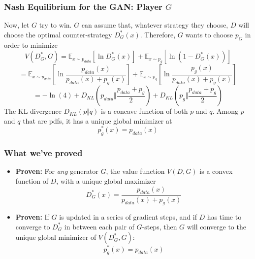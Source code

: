 \documentclass{beamer}
\begin{document}
\begin{frame}
  \frametitle{Nash Equilibrium for the GAN: Player $G$}

  Now, let $G$ try to win. $G$ can assume that, whatever strategy they
  choose, $D$ will choose the optimal counter-strategy $D_G^*(x)$.  Therefore,
  $G$ wants to choose $p_G$ in order to minimize
  \begin{displaymath}
    V(D^*_G,G) = \mathbb{E}_{x\sim p_{data}}\left[\ln D_G^*(x)\right]
    +\mathbb{E}_{x\sim p_g}\left[\ln\left(1-D_G^*(x)\right)\right]
  \end{displaymath}
  \begin{displaymath}
    = \mathbb{E}_{x\sim p_{data}}\left[\ln\frac{p_{data}(x)}{p_{data}(x)+p_g(x)}\right]
    +\mathbb{E}_{x\sim p_g}\left[\ln\frac{p_g(x)}{p_{data}(x)+p_g(x)}\right]
  \end{displaymath}
  \begin{displaymath}
    = -\ln(4)+D_{KL}\left(p_{data}\Vert\frac{p_{data}+p_g}{2}\right)+
    D_{KL}\left(p_g\Vert\frac{p_{data}+p_g}{2}\right)
  \end{displaymath}
  The KL divergence $D_{KL}(p\Vert q)$ is a concave function of both $p$ and $q$.
  Among $p$ and $q$ that are pdfs, it has  a unique global minimizer at
  \begin{displaymath}
    p_g^*(x) = p_{data}(x)
  \end{displaymath}
\end{frame}
  
\begin{frame}
  \frametitle{What we've proved}

  \begin{itemize}
  \item {\bf Proven:} For {\em any} generator $G$, the value
    function $V(D,G)$ is a convex function of $D$, with a unique global
    maximizer
    \[
    D^*_G(x) = \frac{p_{data}(x)}{p_{data}(x)+p_g(x)}
    \]
  \item {\bf Proven:} If $G$ is updated in a series of gradient steps,
    and if $D$ has time to converge to $D^*_G$ in between each pair of
    $G$-steps, then $G$ will converge to the unique global minimizer
    of $V(D^*_G,G)$:
    \[
    p_g^*(x) = p_{data}(x)
    \]
  \end{itemize}
\end{frame}
\end{document}

